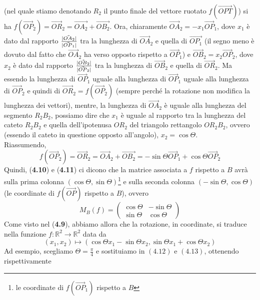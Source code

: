 \begin{esempio}
\begin{enumerate}
    (nel quale stiamo denotando $R_2$ il punto finale del vettore ruotato $f(\vec{OPT})$) si ha
    $f(\vec{OP}_2)=\vec{OR}_2=\vec{OA_2}+\vec{OB_2}$. Ora, chiaramente $\vec{OA}_2=-x_1\vec{OP}_1$, dove $x_1$ è
    dato dal rapporto $\frac{\lvert\vec{OA}_2\rvert}{\lvert\vec{OP}_1\rvert}$ tra la lunghezza di $\vec{OA}_2$ e quella di
    $\vec{OP_1}$ (il segno meno è dovuto dal fatto che $\vec{OA}_2$ ha verso opposto rispetto a $\vec{OP}_1$) e
    $\vec{OB}_2=x_2\vec{OP}_2$, dove $x_2$ è dato dal rapporto $\frac{\lvert\vec{OB}_2\rvert}{\lvert\vec{OP}_2\rvert}$ tra la
    lunghezza di $\vec{OB}_2$ e quella di $\vec{OR}_2$. Ma essendo la lunghezza di $\vec{OP}_1$ uguale alla
    lunghezza di $\vec{OP}_1$ uguale alla lunghezza di $\vec{OP}_2$ e quindi di $\vec{OR}_2=f(\vec{OP}_2)$
    (sempre perché la rotazione non modifica la lunghezza dei vettori), mentre, la lunghezza di $\vec{OA}_2$ è
    uguale alla lunghezza del segmento $R_2B_2$, possiamo dire che $x_1$ è uguale al rapporto tra la lunghezza
    del cateto $R_2B_2$ e quella dell'ipotenusa $OR_2$ del triangolo rettangolo $OR_2B_2$, ovvero (essendo il
    cateto in questione opposto all'angolo), $x_2=\cos\Theta$.\\
    Riassumendo,
    \begin{equation}
      f(\vec{OP}_2)=\vec{OR}_2=\vec{OA}_2+\vec{OB_2}=-\sin\Theta\vec{OP}_1+\cos \Theta\vec{OP}_2
    \end{equation}
    \clearpage
    Quindi, (\textbf{4.10}) e (\textbf{4.11}) ci dicono che la matrice associata a $f$ rispetto a $B$ avrà sulla
    prima colonna $(\cos\Theta,\sin\Theta)$\footnote{le coordinate di $f(\vec{OP}_1)$ rispetto a $B$} e sulla
    seconda colonna $(-\sin\Theta,\cos\Theta)$ (le coordinate di $f(\vec{OP})$ rispetto a $B$), ovvero
    \begin{equation}
      M_B(f)=
      \begin{pmatrix}
        \cos\Theta & -\sin \Theta\\
        \sin\Theta & \cos \Theta
      \end{pmatrix}
    \end{equation}
    Come visto nel (\textbf{4.9}), abbiamo allora che la rotazione, in coordinate, si traduce nella funzione
    $f:\mathds{R}^2\to\mathds{R}^2$ data da
    \begin{equation}
      (x_1,x_2)\mapsto (\cos\Theta x_1-\sin\Theta x_2,\sin\Theta x_1+\cos\Theta x_2)
    \end{equation}
    Ad esempio, scegliamo $\Theta=\frac{\pi}{4}$ e sostituiamo in $(4.12)$ e $(4.13)$, ottenendo rispettivamente

\end{enumerate}
\end{esempio}
